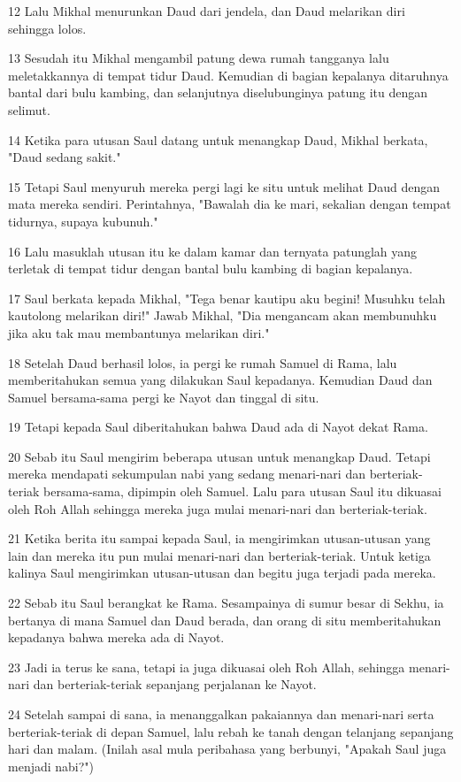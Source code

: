 \par 12 Lalu Mikhal menurunkan Daud dari jendela, dan Daud melarikan diri sehingga lolos.
\par 13 Sesudah itu Mikhal mengambil patung dewa rumah tangganya lalu meletakkannya di tempat tidur Daud. Kemudian di bagian kepalanya ditaruhnya bantal dari bulu kambing, dan selanjutnya diselubunginya patung itu dengan selimut.
\par 14 Ketika para utusan Saul datang untuk menangkap Daud, Mikhal berkata, "Daud sedang sakit."
\par 15 Tetapi Saul menyuruh mereka pergi lagi ke situ untuk melihat Daud dengan mata mereka sendiri. Perintahnya, "Bawalah dia ke mari, sekalian dengan tempat tidurnya, supaya kubunuh."
\par 16 Lalu masuklah utusan itu ke dalam kamar dan ternyata patunglah yang terletak di tempat tidur dengan bantal bulu kambing di bagian kepalanya.
\par 17 Saul berkata kepada Mikhal, "Tega benar kautipu aku begini! Musuhku telah kautolong melarikan diri!" Jawab Mikhal, "Dia mengancam akan membunuhku jika aku tak mau membantunya melarikan diri."
\par 18 Setelah Daud berhasil lolos, ia pergi ke rumah Samuel di Rama, lalu memberitahukan semua yang dilakukan Saul kepadanya. Kemudian Daud dan Samuel bersama-sama pergi ke Nayot dan tinggal di situ.
\par 19 Tetapi kepada Saul diberitahukan bahwa Daud ada di Nayot dekat Rama.
\par 20 Sebab itu Saul mengirim beberapa utusan untuk menangkap Daud. Tetapi mereka mendapati sekumpulan nabi yang sedang menari-nari dan berteriak-teriak bersama-sama, dipimpin oleh Samuel. Lalu para utusan Saul itu dikuasai oleh Roh Allah sehingga mereka juga mulai menari-nari dan berteriak-teriak.
\par 21 Ketika berita itu sampai kepada Saul, ia mengirimkan utusan-utusan yang lain dan mereka itu pun mulai menari-nari dan berteriak-teriak. Untuk ketiga kalinya Saul mengirimkan utusan-utusan dan begitu juga terjadi pada mereka.
\par 22 Sebab itu Saul berangkat ke Rama. Sesampainya di sumur besar di Sekhu, ia bertanya di mana Samuel dan Daud berada, dan orang di situ memberitahukan kepadanya bahwa mereka ada di Nayot.
\par 23 Jadi ia terus ke sana, tetapi ia juga dikuasai oleh Roh Allah, sehingga menari-nari dan berteriak-teriak sepanjang perjalanan ke Nayot.
\par 24 Setelah sampai di sana, ia menanggalkan pakaiannya dan menari-nari serta berteriak-teriak di depan Samuel, lalu rebah ke tanah dengan telanjang sepanjang hari dan malam. (Inilah asal mula peribahasa yang berbunyi, "Apakah Saul juga menjadi nabi?")

